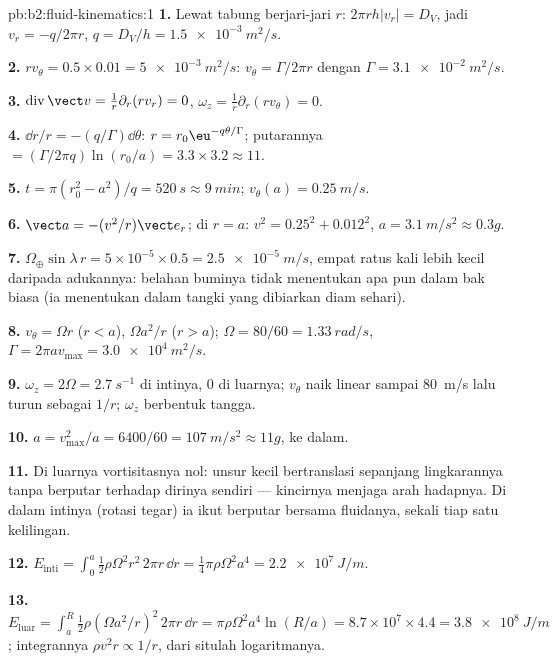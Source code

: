 \begin{solution}{pb:b2:fluid-kinematics:1}
\textbf{1.} Lewat tabung berjari-jari $r$: $2\pi rh|v_r| = D_V$, jadi
$v_r = -q/2\pi r$, $q = D_V/h = \qty{1.5e-3}{m^2/s}$.

\textbf{2.} $rv_\theta = 0.5 \times 0.01 = \qty{5e-3}{m^2/s}$: $v_\theta = \Gamma/2\pi r$
dengan $\Gamma = \qty{3.1e-2}{m^2/s}$.

\textbf{3.} $\operatorname{div}\vect v = \frac1r\partial_r(rv_r) = 0$, $\omega_z =
\frac1r\partial_r(rv_\theta) = 0$.

\textbf{4.} $\dd r/r = -(q/\Gamma)\dd\theta$: $r = r_0\eu^{-q\theta/\Gamma}$; putarannya
$= (\Gamma/2\pi q)\ln(r_0/a) = 3.3 \times 3.2 \approx 11$.

\textbf{5.} $t = \pi(r_0^2 - a^2)/q = \qty{520}{s} \approx \qty{9}{min}$; $v_\theta(a) =
\qty{0.25}{m/s}$.

\textbf{6.} $\vect a = -(v^2/r)\vect e_r$; di $r = a$: $v^2 = 0.25^2 + 0.012^2$,
$a = \qty{3.1}{m/s^2} \approx 0.3g$.

\textbf{7.} $\Omega_\oplus\sin\lambda\,r = 5 \times 10^{-5} \times 0.5 = \qty{2.5e-5}{m/s}$,
empat ratus kali lebih kecil daripada adukannya: belahan buminya tidak
menentukan apa pun dalam bak biasa (ia menentukan dalam tangki yang dibiarkan diam sehari).

\textbf{8.} $v_\theta = \Omega r$ ($r < a$), $\Omega a^2/r$ ($r > a$); $\Omega = 80/60
= \qty{1.33}{rad/s}$, $\Gamma = 2\pi av_{\max} = \qty{3.0e4}{m^2/s}$.

\textbf{9.} $\omega_z = 2\Omega = \qty{2.7}{s^{-1}}$ di intinya, $0$ di luarnya;
$v_\theta$ naik linear sampai \qty{80}{m/s} lalu turun sebagai $1/r$; $\omega_z$ berbentuk
tangga.

\textbf{10.} $a = v_{\max}^2/a = 6400/60 = \qty{107}{m/s^2} \approx 11g$, ke dalam.

\textbf{11.} Di luarnya vortisitasnya nol: unsur kecil bertranslasi
sepanjang lingkarannya tanpa berputar terhadap dirinya sendiri --- kincirnya
menjaga arah hadapnya. Di dalam intinya (rotasi tegar) ia ikut berputar bersama
fluidanya, sekali tiap satu kelilingan.

\textbf{12.} $E_{\text{inti}} = \int_0^a\tfrac12\rho\Omega^2r^2\,2\pi r\,\dd r =
\tfrac14\pi\rho\Omega^2a^4 = \qty{2.2e7}{J/m}$.

\textbf{13.} $E_{\text{luar}} = \int_a^R\tfrac12\rho(\Omega a^2/r)^2\,2\pi r\,\dd r =
\pi\rho\Omega^2a^4\ln(R/a) = 8.7 \times 10^7 \times 4.4 = \qty{3.8e8}{J/m}$;
integrannya $\rho v^2r \propto 1/r$, dari situlah logaritmanya.


\end{solution}
